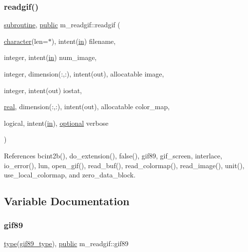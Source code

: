 \subsubsection{\texorpdfstring{readgif()}{readgif()}}
{\footnotesize\ttfamily \hyperlink{M__stopwatch_83_8txt_acfbcff50169d691ff02d4a123ed70482}{subroutine}, \hyperlink{M__stopwatch_83_8txt_a2f74811300c361e53b430611a7d1769f}{public} m\+\_\+readgif\+::readgif (\begin{DoxyParamCaption}\item[{\hyperlink{option__stopwatch_83_8txt_abd4b21fbbd175834027b5224bfe97e66}{character}(len=$\ast$), intent(\hyperlink{M__journal_83_8txt_afce72651d1eed785a2132bee863b2f38}{in})}]{filename,  }\item[{integer, intent(\hyperlink{M__journal_83_8txt_afce72651d1eed785a2132bee863b2f38}{in})}]{num\+\_\+image,  }\item[{integer, dimension(\+:,\+:), intent(out), allocatable}]{image,  }\item[{integer, intent(out)}]{iostat,  }\item[{\hyperlink{read__watch_83_8txt_abdb62bde002f38ef75f810d3a905a823}{real}, dimension(\+:,\+:), intent(out), allocatable}]{color\+\_\+map,  }\item[{logical, intent(\hyperlink{M__journal_83_8txt_afce72651d1eed785a2132bee863b2f38}{in}), \hyperlink{option__stopwatch_83_8txt_aa4ece75e7acf58a4843f70fe18c3ade5}{optional}}]{verbose }\end{DoxyParamCaption})}



References bcint2b(), do\+\_\+extension(), false(), gif89, gif\+\_\+screen, interlace, io\+\_\+error(), lun, open\+\_\+gif(), read\+\_\+buf(), read\+\_\+colormap(), read\+\_\+image(), unit(), use\+\_\+local\+\_\+colormap, and zero\+\_\+data\+\_\+block.



\subsection{Variable Documentation}
\mbox{\label{namespacem__readgif_a1d5a3f008ce6a2b13029a0977dba1aa1}} 
\subsubsection{\texorpdfstring{gif89}{gif89}}
{\footnotesize\ttfamily \hyperlink{stop__watch_83_8txt_a70f0ead91c32e25323c03265aa302c1c}{type}(\hyperlink{structm__readgif_1_1gif89__type}{gif89\+\_\+type}), \hyperlink{M__stopwatch_83_8txt_a2f74811300c361e53b430611a7d1769f}{public} m\+\_\+readgif\+::gif89}

